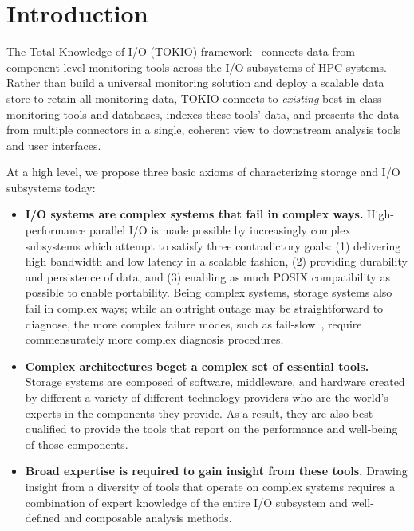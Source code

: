 \section{Introduction} \label{sec:intro}

The Total Knowledge of I/O (TOKIO) framework~\cite{Lockwood2017} connects data from component-level monitoring tools across the I/O subsystems of HPC systems.  Rather than build a universal monitoring solution and deploy a scalable data store to retain all monitoring data, TOKIO connects to \emph{existing} best-in-class monitoring tools and databases, indexes these tools' data, and presents the data from multiple connectors in a single, coherent view to downstream analysis tools and user interfaces.

At a high level, we propose three basic axioms of characterizing storage and I/O subsystems today:

\begin{itemize}[leftmargin=*]
\item \textbf{I/O systems are complex systems that fail in complex ways.}
High-performance parallel I/O is made possible by increasingly complex subsystems which attempt to satisfy three contradictory goals:
(1) delivering high bandwidth and low latency in a scalable fashion,
(2) providing durability and persistence of data, and
(3) enabling as much POSIX compatibility as possible to enable portability.
Being complex systems, storage systems also fail in complex ways;
while an outright outage may be straightforward to diagnose, the more complex failure modes, such as fail-slow~\cite{Gunawi2018}, require commensurately more complex diagnosis procedures.

\item \textbf{Complex architectures beget a complex set of essential tools.}
Storage systems are composed of software, middleware, and hardware created by different a variety of different technology providers who are the world's experts in the components they provide.
As a result, they are also best qualified to provide the tools that report on the performance and well-being of those components.

\item \textbf{Broad expertise is required to gain insight from these tools.}
Drawing insight from a diversity of tools that operate on complex systems requires a combination of expert knowledge of the entire I/O subsystem and well-defined and composable analysis methods.
\end{itemize}

